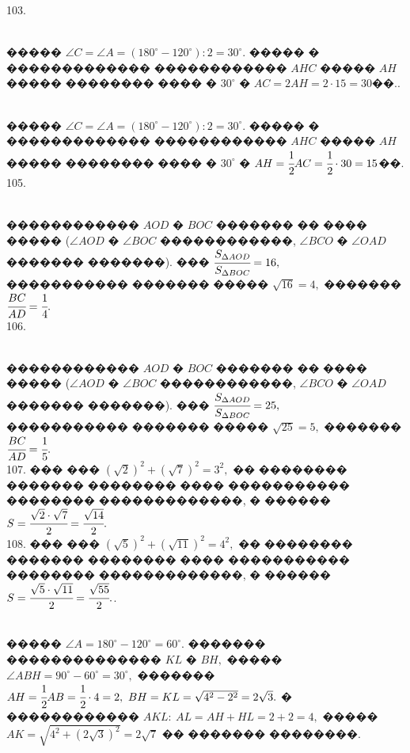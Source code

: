 \documentclass[12pt]{article}
\begin{document}
103. \begin{figure}[ht!]
\end{figure}\\
����� $\angle C=\angle A=(180^\circ-120^\circ):2=30^\circ.$ ����� � ������������� ������������ $AHC$ ����� $AH$ ����� �������� ���� � $30^\circ$ � $AC=2AH=2\cdot15=30$��.\newpage{}. \begin{figure}[ht!]
\end{figure}\\
����� $\angle C=\angle A=(180^\circ-120^\circ):2=30^\circ.$ ����� � ������������� ������������ $AHC$ ����� $AH$ ����� �������� ���� � $30^\circ$ �
$AH=\cfrac{1}{2}AC=\cfrac{1}{2}\cdot30=15$��.\\
105. \begin{figure}[ht!]
\end{figure}\\
������������ $AOD$ � $BOC$ ������� �� ���� ����� ($\angle AOD$ � $\angle BOC$ ������������, $\angle BCO$ � $\angle OAD$ ������� �������). ���
$\cfrac{S_{\Delta AOD}}{S_{\Delta BOC}}=16,$ ����������� ������� ����� $\sqrt{16}=4,$ ������� $\cfrac{BC}{AD}=\cfrac{1}{4}.$\\
106. \begin{figure}[ht!]
\end{figure}\\
������������ $AOD$ � $BOC$ ������� �� ���� ����� ($\angle AOD$ � $\angle BOC$ ������������, $\angle BCO$ � $\angle OAD$ ������� �������). ���
$\cfrac{S_{\Delta AOD}}{S_{\Delta BOC}}=25,$ ����������� ������� ����� $\sqrt{25}=5,$ ������� $\cfrac{BC}{AD}=\cfrac{1}{5}.$\\
107. ��� ��� $(\sqrt{2})^2+(\sqrt{7})^2=3^2,$ �� �������� ������� �������� ���� ����������� �������� �������������, � ������ $S=\cfrac{\sqrt{2}\cdot\sqrt{7}}{2}=\cfrac{\sqrt{14}}{2}.$\\
108. ��� ��� $(\sqrt{5})^2+(\sqrt{11})^2=4^2,$ �� �������� ������� �������� ���� ����������� �������� �������������, � ������ $S=\cfrac{\sqrt{5}\cdot\sqrt{11}}{2}=\cfrac{\sqrt{55}}{2}.$\newpage{}. \begin{figure}[ht!]
\end{figure}\\
����� $\angle A=180^\circ-120^\circ=60^\circ.$ ������� �������������� $KL$ � $BH,$ ����� $\angle ABH=90^\circ-60^\circ=30^\circ,$ ������� $AH=\cfrac{1}{2}AB=\cfrac{1}{2}\cdot4=2,\ BH=KL=\sqrt{4^2-2^2}=2\sqrt{3}.$ � ������������ $AKL:\ AL=AH+HL=2+2=4,$ ����� $AK=\sqrt{4^2+(2\sqrt{3})^2}=2\sqrt{7}$ �� ������� ��������.\\
\end{document}

